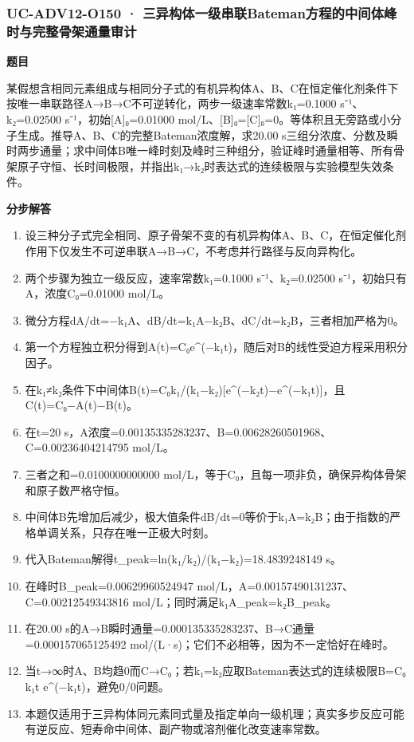 \documentclass[UTF8,11pt,a4paper]{ctexart}
\begin{document}
\subsubsection*{UC-ADV12-O150 · 三异构体一级串联Bateman方程的中间体峰时与完整骨架通量审计}
\noindent\textbf{题目}\par
某假想含相同元素组成与相同分子式的有机异构体A、B、C在恒定催化剂条件下按唯一串联路径A→B→C不可逆转化，两步一级速率常数k₁=0.1000 s⁻¹、k₂=0.02500 s⁻¹，初始[A]₀=0.01000 mol/L、[B]₀=[C]₀=0。等体积且无旁路或小分子生成。推导A、B、C的完整Bateman浓度解，求20.00 s三组分浓度、分数及瞬时两步通量；求中间体B唯一峰时刻及峰时三种组分，验证峰时通量相等、所有骨架原子守恒、长时间极限，并指出k₁→k₂时表达式的连续极限与实验模型失效条件。\par
\medskip\noindent\textbf{分步解答}
\begin{enumerate}
\item 设三种分子式完全相同、原子骨架不变的有机异构体A、B、C，在恒定催化剂作用下仅发生不可逆串联A→B→C，不考虑并行路径与反向异构化。
\item 两个步骤为独立一级反应，速率常数k₁=0.1000 s⁻¹、k₂=0.02500 s⁻¹，初始只有A，浓度C₀=0.01000 mol/L。
\item 微分方程dA/dt=−k₁A、dB/dt=k₁A−k₂B、dC/dt=k₂B，三者相加严格为0。
\item 第一个方程独立积分得到A(t)=C₀e\textasciicircum{}(−k₁t)，随后对B的线性受迫方程采用积分因子。
\item 在k₁≠k₂条件下中间体B(t)=C₀k₁/(k₁−k₂)[e\textasciicircum{}(−k₂t)−e\textasciicircum{}(−k₁t)]，且C(t)=C₀−A(t)−B(t)。
\item 在t=20 s，A浓度=0.00135335283237、B=0.00628260501968、C=0.00236404214795 mol/L。
\item 三者之和=0.0100000000000 mol/L，等于C₀，且每一项非负，确保异构体骨架和原子数严格守恒。
\item 中间体B先增加后减少，极大值条件dB/dt=0等价于k₁A=k₂B；由于指数的严格单调关系，只存在唯一正极大时刻。
\item 代入Bateman解得t\_peak=ln(k₁/k₂)/(k₁−k₂)=18.4839248149 s。
\item 在峰时B\_peak=0.00629960524947 mol/L，A=0.00157490131237、C=0.00212549343816 mol/L；同时满足k₁A\_peak=k₂B\_peak。
\item 在20.00 s的A→B瞬时通量=0.000135335283237、B→C通量=0.000157065125492 mol/(L·s)；它们不必相等，因为不一定恰好在峰时。
\item 当t→∞时A、B均趋0而C→C₀；若k₁=k₂应取Bateman表达式的连续极限B=C₀ k₁t e\textasciicircum{}(−k₁t)，避免0/0问题。
\item 本题仅适用于三异构体同元素同式量及指定单向一级机理；真实多步反应可能有逆反应、短寿命中间体、副产物或溶剂催化改变速率常数。
\end{enumerate}
\end{document}
